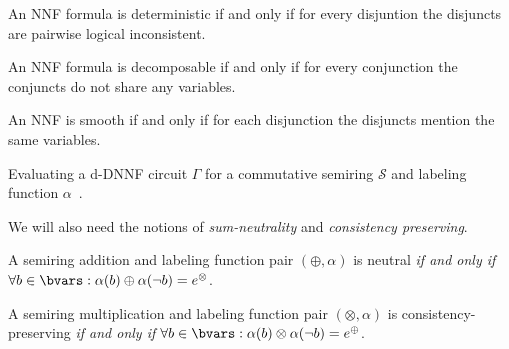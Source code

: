\begin{definition}[Determinism] An NNF formula is deterministic if and only if for every disjuntion the disjuncts are pairwise logical inconsistent.
\end{definition}

\begin{definition}[Decomposability] An NNF formula is decomposable if and only if for every conjunction the conjuncts do not share any variables.
\end{definition}

\begin{definition}[Smoothness] 
An NNF is smooth if and only if for each disjunction the disjuncts mention the same variables.
\end{definition}

\begin{algorithm}[t]

	\caption{Evaluating a d-DNNF circuit $\Gamma$ for a
		commutative semiring $\mathcal{S}$ and labeling function $\alpha$~\citep{kimmig2017algebraic}.}
	\label{alg:eval}
\end{algorithm}



We will also need the notions of {\em sum-neutrality} and {\em consistency preserving}.

\begin{definition}\label{lem:nsp} A semiring addition and labeling function pair $(\oplus,\alpha)$ is neutral \emph{if and only if} $\forall b \in \bvars:  \alpha(b)\oplus \alpha(\neg b)=e^\otimes$.
\end{definition}

\begin{definition}\label{lem:con_prev} A semiring multiplication and labeling function pair $(\otimes,\alpha)$ is consistency-preserving \emph{if and only if} $\forall b \in \bvars:  \alpha(b)\otimes \alpha(\neg b)=e^\oplus$.
\end{definition}

